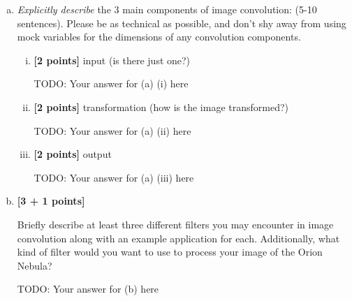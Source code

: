 \begin{enumerate}[(a)]
\item 
\begin{tcolorbox}[colback=orange!5!white,colframe=orange!75!black]
\emph{Explicitly describe} the 3 main components of image convolution: (5-10 sentences). Please be as technical as possible, and don't shy away from using mock variables for the dimensions of any convolution components.
\end{tcolorbox}
\begin{enumerate}[(i)]
    \item \textbf{[2 points]} input (is there just one?) 
    \begin{tcolorbox}[colback=white!5!white,colframe=green!75!black]
    \begin{mdframed}
        TODO: Your answer for (a) (i) here
    \end{mdframed}
\end{tcolorbox}
    
    \item \textbf{[2 points]} transformation (how is the image transformed?) 
\begin{tcolorbox}[colback=white!5!white,colframe=green!75!black]
    \begin{mdframed}
        TODO: Your answer for (a) (ii) here
    \end{mdframed}
\end{tcolorbox}
    
    \item \textbf{[2 points]} output
    \begin{tcolorbox}[colback=white!5!white,colframe=green!75!black]
    \begin{mdframed}
        TODO: Your answer for (a) (iii) here
    \end{mdframed}
\end{tcolorbox}
    
\end{enumerate}


\item \textbf{[3 + 1 points]} 
\begin{tcolorbox}[colback=orange!5!white,colframe=orange!75!black]
Briefly describe at least three different filters you may encounter in image convolution along with an example application for each. Additionally, what kind of filter would you want to use to process your image of the Orion Nebula? 
\end{tcolorbox}

\begin{tcolorbox}[colback=white!5!white,colframe=green!75!black]
\begin{mdframed}
    TODO: Your answer for (b) here
\end{mdframed}
\end{tcolorbox}



\end{enumerate}
